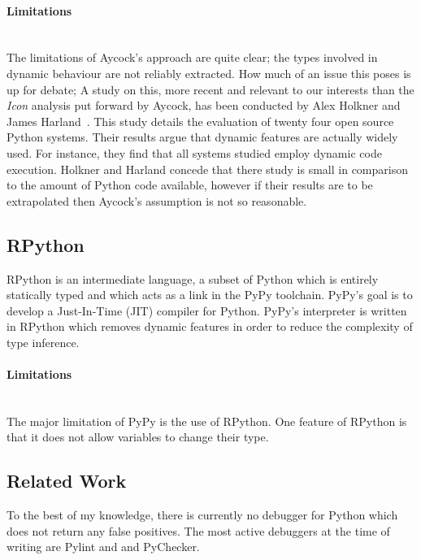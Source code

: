\documentclass[12pt, titlepage]{article}
\begin{document}
\paragraph{Limitations}\mbox{}\\
The limitations of Aycock's approach are quite clear; the types involved in dynamic behaviour are not reliably extracted. How much of an issue this poses is up for debate;
A study on this, more recent and relevant to our interests than the \textit{Icon} analysis put forward by Aycock, has been conducted by Alex Holkner and James Harland~\cite{evaluatingDynamicBehaviour}. This study details the evaluation of twenty four open source Python systems. Their results argue that dynamic features are actually widely used. For instance, they find that all systems studied employ dynamic code execution. Holkner and Harland concede that there study is small in comparison to the amount of Python code available, however if their results are to be extrapolated then Aycock's assumption is not so reasonable.

\subsection{RPython}
RPython is an intermediate language, a subset of Python which is entirely statically typed and which acts as a link in the PyPy toolchain. PyPy's goal is to develop a Just-In-Time (JIT) compiler for Python. PyPy's interpreter is written in RPython which removes dynamic features in order to reduce the complexity of type inference.
\paragraph{Limitations}\mbox{}\\
The major limitation of PyPy is the use of RPython. One feature of RPython is that it does not allow variables to change their type.

\subsection{Related Work}
To the best of my knowledge, there is currently no debugger for Python which does not return any false positives. The most active debuggers at the time of writing are Pylint and and PyChecker.
\end{document}
